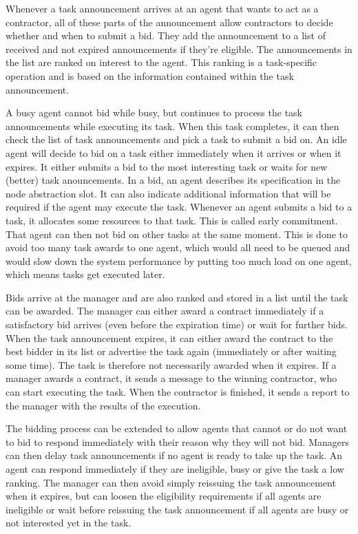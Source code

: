 \documentclass[10pt,a4paper,twocolumn]{article}
\begin{document}
Whenever a task announcement arrives at an agent that wants to act as a contractor, all of these parts of the announcement allow contractors to decide whether and when to submit a bid. They add the announcement to a list of received and not expired announcements if they're eligible. The announcements in the list are ranked on interest to the agent. This ranking is a task-specific operation and is based on the information contained within the task announcement.

A busy agent cannot bid while busy, but continues to process the task announcements while executing its task. When this task completes, it can then check the list of task announcements and pick a task to submit a bid on. An idle agent will decide to bid on a task either immediately when it arrives or when it expires. It either submits a bid to the most interesting task or waits for new (better) task anouncements. In a bid, an agent describes its specification in the node abstraction slot. It can also indicate additional information that will be required if the agent may execute the task. Whenever an agent submits a bid to a task, it allocates some resources to that task. This is called early commitment. That agent can then not bid on other tasks at the same moment. This is done to avoid too many task awards to one agent, which would all need to be queued and would slow down the system performance by putting too much load on one agent, which means tasks get executed later.

Bids arrive at the manager and are also ranked and stored in a list until the task can be awarded. The manager can either award a contract immediately if a satisfactory bid arrives (even before the expiration time) or wait for further bids. When the task announcement expires, it can either award the contract to the best bidder in its list or advertise the task again (immediately or after waiting some time). The task is therefore not necessarily awarded when it expires. If a manager awards a contract, it sends a message to the winning contractor, who can start executing the task. When the contractor is finished, it sends a report to the manager with the results of the execution.

The bidding process can be extended to allow agents that cannot or do not want to bid to respond immediately with their reason why they will not bid. Managers can then delay task announcements if no agent is ready to take up the task. An agent can respond immediately if they are ineligible, busy or give the task a low ranking. The manager can then avoid simply reissuing the task announcement when it expires, but can loosen the eligibility requirements if all agents are ineligible or wait before reissuing the task announcement if all agents are busy or not interested yet in the task.
\end{document}
